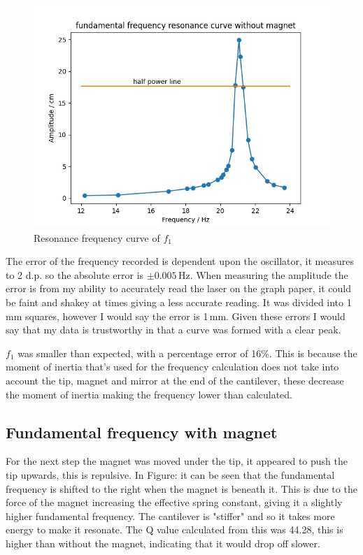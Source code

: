 \documentclass{article}
\begin{document}
\begin{figure}[h]
    \centering
    \captionsetup{justification=centering}
    \includegraphics[width=12cm]{10.jpg}
    \caption{Resonance frequency curve of $f_1$ \label{f1}}
\end{figure}

The error of the frequency recorded is dependent upon the oscillator, it measures to 2 d.p. so the absolute
error is $\pm 0.005$\,Hz. When measuring the amplitude the error is from my ability to accurately read the laser
on the graph paper, it could be faint and shakey at times giving a less accurate reading. It was divided 
into 1\,mm squares, however I would say the error is 1\,mm. Given these errors I would say that my data is 
trustworthy in that a curve was formed with a clear peak.

$f_1$ was smaller than expected, with a percentage error of 16\%. This is because the moment of inertia that's used for the frequency calculation
does not take into account the tip, magnet and mirror at the end of the cantilever, these decrease the moment of 
inertia making the frequency lower than calculated. 
\newpage
\subsection*{Fundamental frequency with magnet}
For the next step the magnet was moved under the tip, it appeared to push the tip upwards, this is repulsive. 
In Figure: \label{f2} it can be seen that the fundamental frequency is shifted to the right when the magnet is 
beneath it. This is due to the force of the magnet increasing the effective spring constant, giving it a slightly
higher fundamental frequency. The cantilever is "stiffer" and so it takes more energy to make it resonate. 
The Q value calculated from this was 44.28, this is higher than without the magnet, indicating that 
it would drop off slower.
\end{document}
